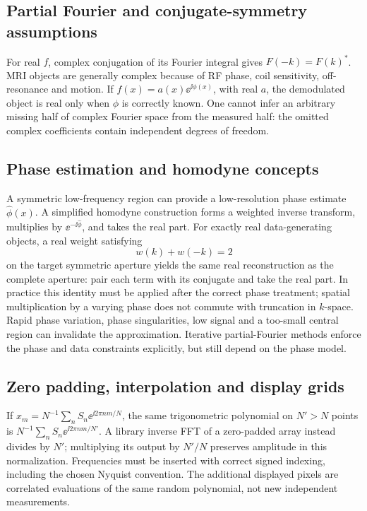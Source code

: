 \subsection{Partial Fourier and conjugate-symmetry assumptions}
For real \(f\), complex conjugation of its Fourier integral gives
\(F(-k)=F(k)^*\). MRI objects are generally complex because of RF phase, coil sensitivity, off-resonance and motion. If \(f(x)=a(x)\ee^{\ii\phi(x)}\), with real \(a\), the demodulated object is real only when \(\phi\) is correctly known. One cannot infer an arbitrary missing half of complex Fourier space from the measured half: the omitted complex coefficients contain independent degrees of freedom.

\subsection{Phase estimation and homodyne concepts}
A symmetric low-frequency region can provide a low-resolution phase estimate \(\hat\phi(x)\). A simplified homodyne construction forms a weighted inverse transform, multiplies by \(\ee^{-\ii\hat\phi}\), and takes the real part. For exactly real data-generating objects, a real weight satisfying
\[
 w(k)+w(-k)=2
\]
on the target symmetric aperture yields the same real reconstruction as the complete aperture: pair each term with its conjugate and take the real part. In practice this identity must be applied after the correct phase treatment; spatial multiplication by a varying phase does not commute with truncation in \(k\)-space. Rapid phase variation, phase singularities, low signal and a too-small central region can invalidate the approximation. Iterative partial-Fourier methods enforce the phase and data constraints explicitly, but still depend on the phase model.

\subsection{Zero padding, interpolation and display grids}
If \(x_m=N^{-1}\sum_n S_n\ee^{\ii2\pi nm/N}\), the same trigonometric polynomial on \(N'>N\) points is
\(N^{-1}\sum_n S_n\ee^{\ii2\pi nm/N'}\).
A library inverse FFT of a zero-padded array instead divides by \(N'\); multiplying its output by \(N'/N\) preserves amplitude in this normalization. Frequencies must be inserted with correct signed indexing, including the chosen Nyquist convention. The additional displayed pixels are correlated evaluations of the same random polynomial, not new independent measurements.

